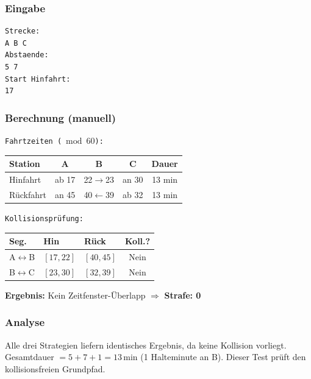 \documentclass[12pt,a4paper]{article}
\begin{document}
\noindent
\begin{minipage}[t]{0.48\textwidth}
\scriptsize
\setlength{\tabcolsep}{2pt}

\subsubsection*{Eingabe}
\begin{lstlisting}
Strecke:
A B C
Abstaende:
5 7
Start Hinfahrt:
17
\end{lstlisting}

\subsubsection*{Berechnung (manuell)}
\texttt{Fahrtzeiten ($\bmod 60$):}\\[2pt]
\begin{tabular}{l|ccc|c}
\toprule
\textbf{Station} & \textbf{A} & \textbf{B} & \textbf{C} & \textbf{Dauer}\\
\midrule
Hinfahrt  & ab 17 & 22$\to$23 & an 30 & 13 min\\
Rückfahrt & an 45 & 40$\leftarrow$39 & ab 32 & 13 min\\
\bottomrule
\end{tabular}

\vspace{4pt}
\texttt{Kollisionsprüfung:}\\[2pt]
\begin{tabularx}{\columnwidth}{lllc}
\toprule
\textbf{Seg.} & \textbf{Hin} & \textbf{Rück} & \textbf{Koll.?}\\
\midrule
A$\leftrightarrow$B & $[17,22]$ & $[40,45]$ & Nein\\
B$\leftrightarrow$C & $[23,30]$ & $[32,39]$ & Nein\\
\bottomrule
\end{tabularx}

\vspace{4pt}
\textbf{Ergebnis:} Kein Zeitfenster-Überlapp $\Rightarrow$ \textbf{Strafe: 0}

\subsubsection*{Analyse}
Alle drei Strategien liefern identisches Ergebnis, da keine Kollision vorliegt.
Gesamtdauer $= 5+7+1 = 13$\,min (1 Halteminute an B).
Dieser Test prüft den kollisionsfreien Grundpfad.
\end{minipage}
\hfill
\end{document}
